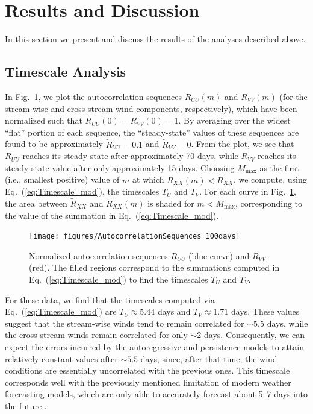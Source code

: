 \documentclass[11pt, oneside]{article}
\newcommand{\figref}[1]{Fig.~\ref{#1}}
\newcommand{\eqnref}[1]{Eq.~(\ref{#1})}
\begin{document}
\section{Results and Discussion}\label{sec:Results}
In this section we present and discuss the results of the analyses described above.

\subsection{Timescale Analysis}\label{sec:Results:Timescale}
In \figref{fig:Autocorrelations}, we plot the autocorrelation sequences $R_{UU}(m)$ and $R_{VV}(m)$ (for the stream-wise and cross-stream wind components, respectively), which have been normalized such that $R_{UU}(0) = R_{VV}(0) = 1$.
By averaging over the widest ``flat'' portion of each sequence, the ``steady-state'' values of these sequences are found to be approximately $\tilde{R}_{UU} = 0.1$ and $\tilde{R}_{VV} = 0$.
From the plot, we see that $R_{UU}$ reaches its steady-state after approximately 70 days,
while $R_{VV}$ reaches its steady-state value after only approximately 15 days.
Choosing $M_\text{max}$ as the first (i.e., smallest positive) value of $m$ at which $R_{XX}(m) < \tilde{R}_{XX}$, we compute, using \eqnref{eq:Timescale_mod}, the timescales $T_U$ and $T_V$.
For each curve in \figref{fig:Autocorrelations}, the area between $\tilde{R}_{XX}$ and $R_{XX}(m)$ is shaded for $m < M_\text{max}$, corresponding to the value of the summation in \eqnref{eq:Timescale_mod}.

\begin{figure}[htb]
\centering
\texttt{[image: figures/AutocorrelationSequences\_100days]}
\caption{Normalized autocorrelation sequences $R_{UU}$ (blue curve) and $R_{VV}$ (red).
The filled regions correspond to the summations computed in \eqnref{eq:Timescale_mod} to find the timescales $T_U$ and $T_V$.}
\label{fig:Autocorrelations}
\end{figure}

For these data, we find that the timescales computed via \eqnref{eq:Timescale_mod} are $T_U \approx 5.44$ days and $T_V \approx 1.71$ days.
These values suggest that the stream-wise winds tend to remain correlated for $\sim 5.5$ days, while the cross-stream winds remain correlated for only $\sim 2$ days.
Consequently, we can expect the errors incurred by the autoregressive and persistence models to attain relatively constant values after $\sim 5.5$ days, since, after that time, the wind conditions are essentially uncorrelated with the previous ones.
This timescale corresponds well with the previously mentioned limitation of modern weather forecasting models, which are only able to accurately forecast about 5--7 days into the future \citep[Sec.~1.2]{Giebel2011}.
\end{document}
